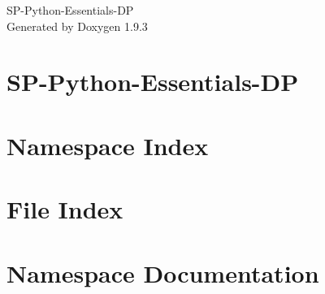 \documentclass[twoside]{book}
\newcommand{\+}{\discretionary{\mbox{\scriptsize$\hookleftarrow$}}{}{}}
\newcommand{\clearemptydoublepage}{%
    \newpage{\pagestyle{empty}\cleardoublepage}%
  }
\begin{document}
  \raggedbottom
    \hypersetup{pageanchor=false,
                bookmarksnumbered=true,
                pdfencoding=unicode
               }
  \begin{titlepage}
  \vspace*{7cm}
  \begin{center}%
  {\Large SP-\/\+Python-\/\+Essentials-\/\+DP}\\
  \vspace*{1cm}
  {\large Generated by Doxygen 1.9.3}\\
  \end{center}
  \end{titlepage}
  \clearemptydoublepage
  \tableofcontents
  \clearemptydoublepage
  \hypersetup{pageanchor=true}
\chapter{SP-\/\+Python-\/\+Essentials-\/\+DP}
\label{md__r_e_a_d_m_e}

\chapter{Namespace Index}

\chapter{File Index}

\chapter{Namespace Documentation}















\end{document}
